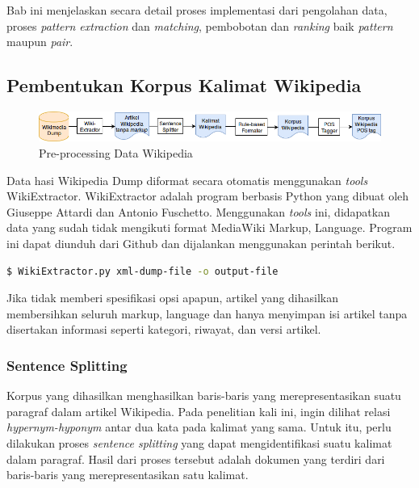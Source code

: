 \chapter{\babEmpat}
Bab ini menjelaskan secara detail proses implementasi dari pengolahan data, proses \textit{pattern extraction} dan \textit{matching}, pembobotan dan \textit{ranking} baik \textit{pattern} maupun \textit{pair}.

\section{Pembentukan Korpus Kalimat Wikipedia}
\begin{figure}
    \centering
    \includegraphics[width=\linewidth]{pics/Pic02-PreProcessingWikipedia}
    \caption{Pre-processing Data Wikipedia}
    \label{fig:preproses-wiki}
\end{figure}
Data hasi Wikipedia Dump diformat secara otomatis menggunakan \textit{tools} WikiExtractor. WikiExtractor adalah program berbasis Python yang dibuat oleh Giuseppe Attardi dan Antonio Fuschetto. Menggunakan \textit{tools} ini, didapatkan data yang sudah tidak mengikuti format MediaWiki Markup, Language. Program ini dapat diunduh dari Github dan dijalankan menggunakan perintah berikut. 

\begin{lstlisting}[caption={Penggunaan Wiki Extractor}, language=bash]
$ WikiExtractor.py xml-dump-file -o output-file
\end{lstlisting}

\noindent Jika tidak memberi spesifikasi opsi apapun, artikel yang dihasilkan membersihkan seluruh markup, language dan hanya menyimpan isi artikel tanpa disertakan informasi seperti kategori, riwayat, dan versi artikel.

\subsection{Sentence Splitting}
Korpus yang dihasilkan menghasilkan baris-baris yang merepresentasikan suatu paragraf dalam artikel Wikipedia. Pada penelitian kali ini, ingin dilihat relasi \textit{hypernym-hyponym} antar dua kata pada kalimat yang sama. Untuk itu, perlu dilakukan proses \textit{sentence splitting} yang dapat mengidentifikasi suatu kalimat dalam paragraf. Hasil dari proses tersebut adalah dokumen yang terdiri dari baris-baris yang merepresentasikan satu kalimat. 

